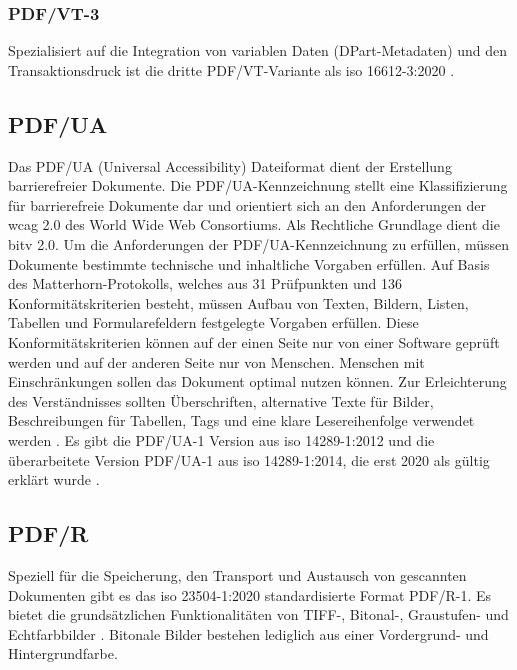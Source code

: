 \subsubsection{PDF/VT-3}
Spezialisiert auf die Integration von variablen Daten (DPart-Metadaten) und den Transaktionsdruck ist die dritte PDF/VT-Variante als \gls{iso} 16612-3:2020 \cite{proj-consult}.

\subsection{PDF/UA}
Das PDF/UA (Universal Accessibility) Dateiformat dient der Erstellung barrierefreier Dokumente. Die PDF/UA-Kennzeichnung stellt eine Klassifizierung für barrierefreie Dokumente dar und orientiert sich an den Anforderungen der \gls{wcag} 2.0 des World Wide Web Consortiums. Als Rechtliche Grundlage dient die \gls{bitv} 2.0. Um die Anforderungen der PDF/UA-Kennzeichnung zu erfüllen, müssen Dokumente bestimmte technische und inhaltliche Vorgaben erfüllen. Auf Basis des Matterhorn-Protokolls, welches aus 31 Prüfpunkten und 136 Konformitätskriterien besteht, müssen Aufbau von Texten, Bildern, Listen, Tabellen und Formularefeldern festgelegte Vorgaben erfüllen. Diese Konformitätskriterien können auf der einen Seite nur von einer Software geprüft werden und auf der anderen Seite nur von Menschen. Menschen mit Einschränkungen sollen das Dokument optimal nutzen können. Zur Erleichterung des Verständnisses sollten Überschriften, alternative Texte für Bilder, Beschreibungen für Tabellen, Tags und eine klare Lesereihenfolge verwendet werden \cite{adobe-pdf-ua}. Es gibt die PDF/UA-1 Version aus \gls{iso} 14289-1:2012 und die überarbeitete Version PDF/UA-1 aus \gls{iso} 14289-1:2014, die erst 2020 als gültig erklärt wurde \cite{proj-consult}.

\subsection{PDF/R}
Speziell für die Speicherung, den Transport und Austausch von gescannten Dokumenten gibt es das \gls{iso} 23504-1:2020 standardisierte Format PDF/R-1. Es bietet die grundsätzlichen Funktionalitäten von TIFF-, Bitonal-, Graustufen- und Echtfarbbilder \cite{proj-consult}. Bitonale Bilder bestehen lediglich aus einer Vordergrund- und Hintergrundfarbe. 

